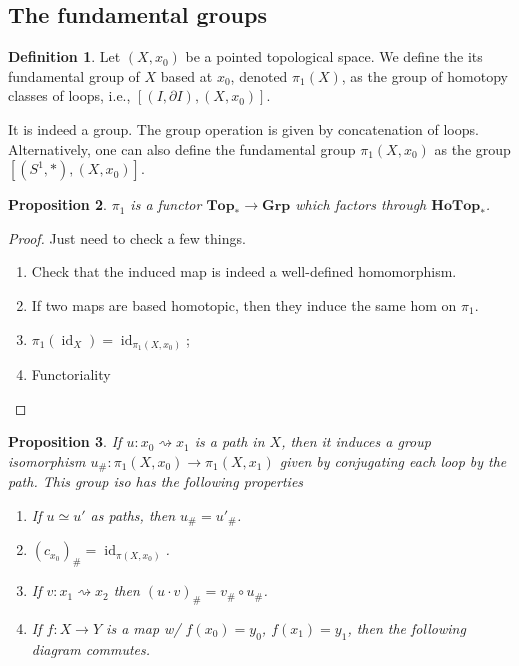 \documentclass{article}
\theoremstyle{definition}
\newtheorem{defn}{Definition}[section]
\theoremstyle{remark}
\theoremstyle{plain}
\newtheorem{prop}[defn]{Proposition}
\newcommand{\id}{\operatorname{id}}
\begin{document}
\subsection{The fundamental groups}
\begin{defn}
    Let $(X,x_0)$ be a pointed topological space. We define the its fundamental group of $X$ based at $x_0$, denoted $\pi_1(X)$, as the group of homotopy classes of loops, i.e., $[(I,\partial I),(X,x_0)]$.
\end{defn}
It is indeed a group. The group operation is given by concatenation of loops. Alternatively, one can also define the fundamental group $\pi_1(X,x_0)$ as the group $[(S^1,\ast),(X,x_0)]$.
\begin{prop}
    $\pi_1$ is a functor $\mathbf{Top}_\ast\to\mathbf{Grp}$ which factors through $\mathbf{HoTop}_\ast$.
\end{prop}
\begin{proof}
    Just need to check a few things.\begin{enumerate}
        \item Check that the induced map is indeed a well-defined homomorphism.
        \item If two maps are based homotopic, then they induce the same hom on $\pi_1$.
        \item $\pi_1(\id_X)=\id_{\pi_1(X,x_0)}$;
        \item Functoriality
    \end{enumerate}
\end{proof}
\begin{prop}
    If $u:x_0\rightsquigarrow x_1$ is a path in $X$, then it induces a group isomorphism $u_\#:\pi_1(X,x_0)\to\pi_1(X,x_1)$ given by conjugating each loop by the path. This group iso has the following properties
    \begin{enumerate}
        \item If $u\simeq u'$ as paths, then $u_\#=u'_\#$.
        \item $(c_{x_0})_\#=\id_{\pi(X,x_0)}$.
        \item If $v:x_1\rightsquigarrow x_2$ then $(u\cdot v)_\#=v_\#\circ u_\#$.
        \item If $f:X\to Y$ is a map w/ $f(x_0)=y_0$, $f(x_1)=y_1$, then the following diagram commutes.
        \begin{center}
        \end{center}
    \end{enumerate}
\end{prop}
\end{document}
